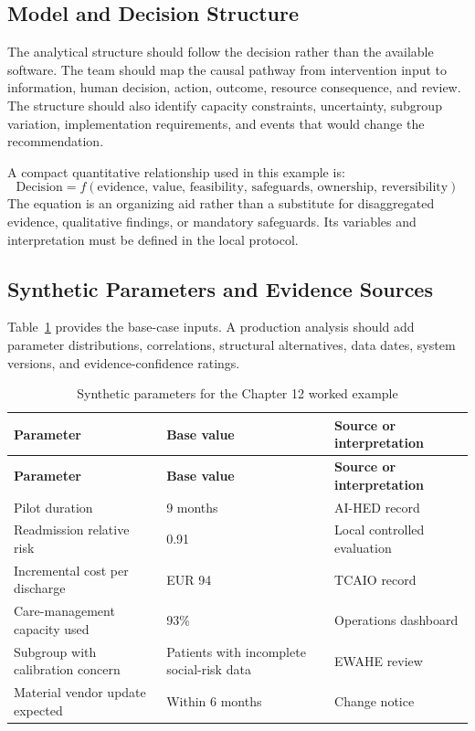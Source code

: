 \subsection{Model and Decision Structure}
The analytical structure should follow the decision rather than the available
software. The team should map the causal pathway from intervention input to
information, human decision, action, outcome, resource consequence, and review.
The structure should also identify capacity constraints, uncertainty, subgroup
variation, implementation requirements, and events that would change the
recommendation.

A compact quantitative relationship used in this example is:
\begin{equation}
\text{Decision}=f(\text{evidence, value, feasibility, safeguards, ownership, reversibility})
\label{eq:comp-ch12-key-relationship}
\end{equation}
The equation is an organizing aid rather than a substitute for disaggregated evidence,
qualitative findings, or mandatory safeguards. Its variables and interpretation must
be defined in the local protocol.

\subsection{Synthetic Parameters and Evidence Sources}
Table~\ref{tab:comp-ch12-parameters} provides the base-case inputs. A
production analysis should add parameter distributions, correlations, structural
alternatives, data dates, system versions, and evidence-confidence ratings.

\begin{longtable}{@{}p{}p{}p{}@{}}
\caption{Synthetic parameters for the Chapter 12 worked example}
\label{tab:comp-ch12-parameters}\\
\toprule
\textbf{Parameter} & \textbf{Base value} & \textbf{Source or interpretation} \\
\midrule
\endfirsthead
\toprule
\textbf{Parameter} & \textbf{Base value} & \textbf{Source or interpretation} \\
\midrule
\endhead
\bottomrule
\endlastfoot
Pilot duration & 9 months & AI-HED record \\
Readmission relative risk & 0.91 & Local controlled evaluation \\
Incremental cost per discharge & EUR 94 & TCAIO record \\
Care-management capacity used & 93\% & Operations dashboard \\
Subgroup with calibration concern & Patients with incomplete social-risk data & EWAHE review \\
Material vendor update expected & Within 6 months & Change notice \\
\end{longtable}

